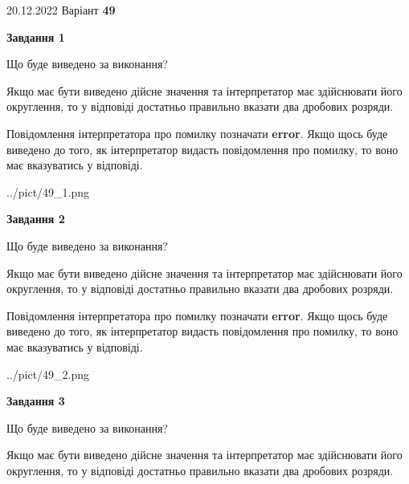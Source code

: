\documentclass[12pt, ukrainian]{article}
\begin{document}
{20.12.2022 Варіант \No \textbf { 49 }\par}
{
\begin {Large}

{\begin {center}\textbf{Завдання 1}\end {center}}\par
Що буде виведено за виконання? \par

Якщо має бути виведено дійсне значення та інтерпретатор має здійснювати його округлення, 
то у відповіді достатньо правильно вказати два дробових розряди.

Повідомлення інтерпретатора про помилку позначати \textbf{error}.
Якщо щось буде виведено до того, як інтерпретатор видасть повідомлення про помилку, 
то воно має вказуватись у відповіді. \par

\begin{center}
	{../pict/49_1.png}
\end{center}
\newpage

{\begin {center}\textbf{Завдання 2}\end {center}}\par
Що буде виведено за виконання? \par

Якщо має бути виведено дійсне значення та інтерпретатор має здійснювати його округлення, 
то у відповіді достатньо правильно вказати два дробових розряди.

Повідомлення інтерпретатора про помилку позначати \textbf{error}.
Якщо щось буде виведено до того, як інтерпретатор видасть повідомлення про помилку, 
то воно має вказуватись у відповіді. \par

\begin{center}
	{../pict/49_2.png}
\end{center}
\newpage

{\begin {center}\textbf{Завдання 3}\end {center}}\par
Що буде виведено за виконання? \par

Якщо має бути виведено дійсне значення та інтерпретатор має здійснювати його округлення, 
то у відповіді достатньо правильно вказати два дробових розряди.


\end{Large}}
\end{document}
